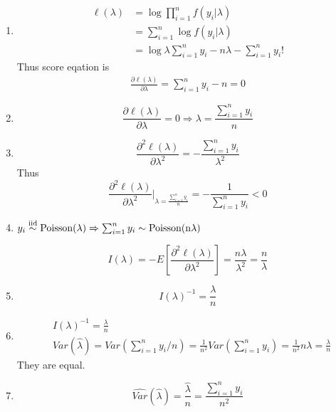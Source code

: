 \documentclass{article}
\begin{document}
\begin{enumerate}[leftmargin = 0 em, label = \arabic*., font = \bfseries]
\begin{enumerate}
		 \item 
		\begin{align*}
		\ell (\lambda) & = \log \prod_{i=1}^n f(y_i | \lambda)\\
		& = \sum_{i=1}^n \log f(y_i | \lambda)\\
		& = \log \lambda \sum_{i=1}^n y_i - n \lambda - \sum_{i=1}^n y_i !
		\end{align*}
		Thus score eqation is
		\begin{align*}
		\frac{\partial \ell (\lambda)}{\partial \lambda} = \sum_{i=1}^n y_i - n = 0
		\end{align*}

		\item 
		\[ \frac{\partial \ell (\lambda)}{\partial \lambda} = 0 \Rightarrow \lambda = \frac{\sum_{i=1}^n y_i}{n}\]

		\item 
		\[\frac{\partial^2 \ell (\lambda)}{\partial \lambda^2} = -\frac{\sum_{i=1}^n y_i}{\lambda^2}\]
		Thus 
		\[\frac{\partial^2 \ell (\lambda)}{\partial \lambda^2}\bigg |_{\lambda = \frac{\sum_{i=1}^n y_i}{n}} = - \frac{1}{\sum_{i=1}^n y_i} < 0\]

		\item 
		$y_i \overset{\rm{iid}}{\sim}\mathrm{Poisson(\lambda)} \Rightarrow \sum_{i=1}^n y_i \sim \mathrm{Poisson(n\lambda)}$

		\[ I(\lambda ) = - E\left[\frac{\partial^2 \ell (\lambda)}{\partial \lambda^2}\right] = \frac{n \lambda}{\lambda^2} = \frac{n}{\lambda}\]

		\item 
		\[{I(\lambda)}^{-1} = \frac{\lambda}{n}\]

		\item 
		\begin{align*}
		& {I(\lambda)}^{-1} = \frac{\lambda}{n}\\
		& Var(\hat{\lambda}) = Var\left(\sum_{i=1}^n y_i / n\right) = \frac{1}{n^2} Var\left(\sum_{i=1}^n y_i\right) = \frac{1}{n^2} n \lambda  = \frac{\lambda}{n}	
		\end{align*}
		They are equal.
		\item 
		\[\hat{Var}(\hat{\lambda}) = \frac{\hat{\lambda}}{n} = \frac{\sum_{i=1}^n y_i}{n^2}\]

		  
	\end{enumerate}


\end{enumerate}
\end{document}
